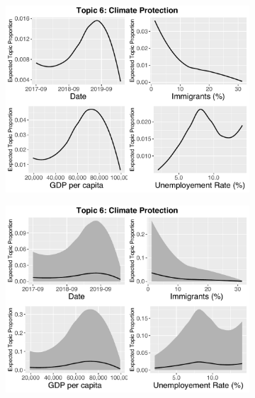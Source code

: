 \begin{figure}[h!]
    \centering
     \captionsetup{justification=centering,margin=2cm}
  \begin{subfigure}[b]{0.3\linewidth}
    \includegraphics[width=\linewidth]{../plots/5_1/direct_t6_without_credible.pdf}
  \end{subfigure}
  \begin{subfigure}[b]{0.3\linewidth}
    \includegraphics[width=\linewidth]{../plots/5_1/direct_t6_with_credible.pdf}
  \end{subfigure}
  \begin{subfigure}[b]{0.3\linewidth}

\end{subfigure}
\end{figure}
